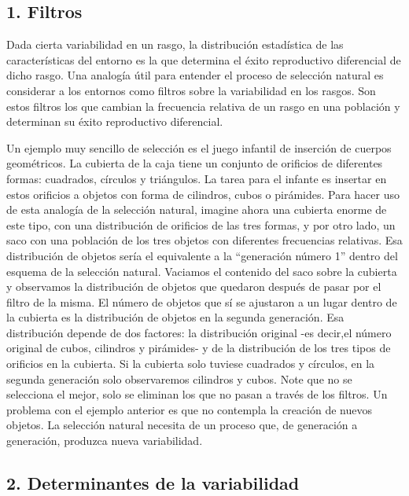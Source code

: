 \documentclass[
  letterpaper,
]{book}
\begin{document}
\subsection{1. Filtros}\label{filtros}

Dada cierta variabilidad en un rasgo, la distribución estadística de las
características del entorno es la que determina el éxito reproductivo
diferencial de dicho rasgo. Una analogía útil para entender el proceso
de selección natural es considerar a los entornos como filtros sobre la
variabilidad en los rasgos. Son estos filtros los que cambian la
frecuencia relativa de un rasgo en una población y determinan su éxito
reproductivo diferencial.

Un ejemplo muy sencillo de selección es el juego infantil de inserción
de cuerpos geométricos. La cubierta de la caja tiene un conjunto de
orificios de diferentes formas: cuadrados, círculos y triángulos. La
tarea para el infante es insertar en estos orificios a objetos con forma
de cilindros, cubos o pirámides. Para hacer uso de esta analogía de la
selección natural, imagine ahora una cubierta enorme de este tipo, con
una distribución de orificios de las tres formas, y por otro lado, un
saco con una población de los tres objetos con diferentes frecuencias
relativas. Esa distribución de objetos sería el equivalente a la
``generación número 1'' dentro del esquema de la selección natural.
Vaciamos el contenido del saco sobre la cubierta y observamos la
distribución de objetos que quedaron después de pasar por el filtro de
la misma. El número de objetos que sí se ajustaron a un lugar dentro de
la cubierta es la distribución de objetos en la segunda generación. Esa
distribución depende de dos factores: la distribución original -es
decir,el número original de cubos, cilindros y pirámides- y de la
distribución de los tres tipos de orificios en la cubierta. Si la
cubierta solo tuviese cuadrados y círculos, en la segunda generación
solo observaremos cilindros y cubos. Note que no se selecciona el mejor,
solo se eliminan los que no pasan a través de los filtros. Un problema
con el ejemplo anterior es que no contempla la creación de nuevos
objetos. La selección natural necesita de un proceso que, de generación
a generación, produzca nueva variabilidad.

\subsection{2. Determinantes de la
variabilidad}\label{determinantes-de-la-variabilidad}
\end{document}
